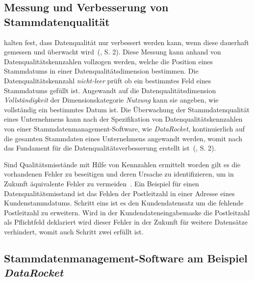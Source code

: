 \documentclass[
  language=german, %
  type=bachelor,%
  ngerman
]{isthesis}
\begin{document}
\begin{content}
	\subsection{Messung und Verbesserung von Stammdatenqualität}
	\textsc{\citeauthor{baghi2013controlling}} halten fest, dass Datenqualität
	nur verbessert werden kann, wenn diese dauerhaft gemessen und überwacht
	wird~(\citeyear{baghi2013controlling}, S. 2). Diese Messung kann anhand von
	Datenqualitätskennzahlen vollzogen werden, welche die Position eines
	Stammdatums in einer Datenqualitätsdimension bestimmen. Die
	Datenqualitätskennzahl \textit{nicht-leer} prüft \zB{} ob ein bestimmtes Feld
	eines Stammdatums gefüllt ist. Angewandt auf die Datenqualitätsdimension
	\textit{Vollständigkeit} der Dimensionskategorie \textit{Nutzung} kann sie
	angeben, wie vollständig ein bestimmtes Datum ist. Die Überwachung der
	Stammdatenqualität eines Unternehmens kann nach der Spezifikation von
	Datenqualitätskennzahlen von einer Stammdatenmanagement-Software, wie \zB{}
	\textit{DataRocket}, kontinuierlich auf die gesamten Stammdaten eines
	Unternehmens angewandt werden, womit nach
	\textsc{\citeauthor{baghi2013controlling}} das Fundament für die
	Datenqualitätsverbesserung erstellt ist~(\citeyear{baghi2013controlling}, S.
	2).

  Sind Qualitätsmisstände mit Hilfe von Kennzahlen ermittelt worden gilt es die
  vorhandenen Fehler zu beseitigen und deren Ursache zu identifizieren, um in
  Zukunft äquivalente Fehler zu vermeiden~\cite[][S. 22]{eckerson2002data}. Ein
  Beispiel für einen Datenqualitätsmisstand ist das Fehlen der Postleitzahl in
  einer Adresse eines Kundenstammdatums. Schritt eins ist es den
  Kundendatensatz um die fehlende Postleitzahl zu erweitern. Wird in der
  Kundendateneingabemaske die Postleitzahl als Pflichtfeld deklariert wird
  dieser Fehler in der Zukunft für weitere Datensätze verhindert, womit auch
  Schritt zwei erfüllt ist.


  \subsection{Stammdatenmanagement-Software am Beispiel \textit{DataRocket}}\label{sec:Vorstellung-DataRocket}


\end{content}
\end{document}
